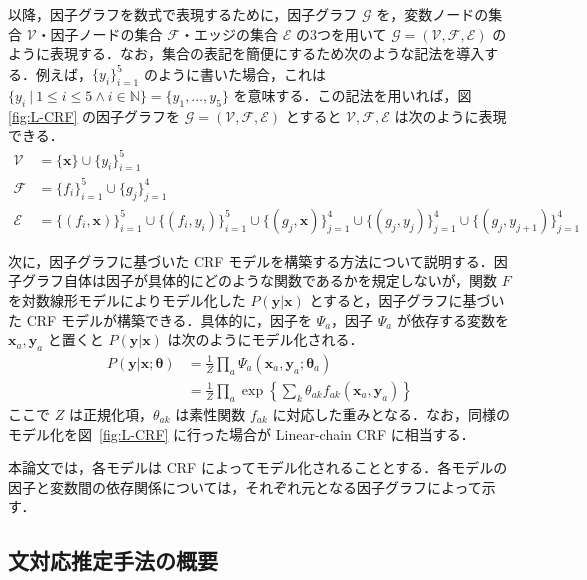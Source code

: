 \documentclass[japanese]{jnlp_1.4}
\begin{document}
以降，因子グラフを数式で表現するために，因子グラフ $\mathcal{G}$ を，変数ノードの集合 $\mathcal{V}$・因子ノードの集合 $\mathcal{F}$・エッジの集合 $\mathcal{E}$ の3つを用いて $\mathcal{G} = (\mathcal{V},\mathcal{F},\mathcal{E})$ のように表現する．なお，集合の表記を簡便にするため次のような記法を導入する．例えば，$\{ y_i \}_{i=1}^{5}$ のように書いた場合，これは $\{ y_i ~|~ 1 \leq i \leq 5 \wedge i \in \mathbb{N} \} = \{ y_1, \dots, y_5 \}$ を意味する．この記法を用いれば，図 \ref{fig:L-CRF} の因子グラフを $\mathcal{G} = (\mathcal{V},\mathcal{F},\mathcal{E})$  とすると $\mathcal{V},\mathcal{F},\mathcal{E}$ は次のように表現できる．
\begin{equation}
\begin{split}
  \mathcal{V} &= \{ \bm{x} \} \cup \{ y_i \}_{i=1}^{5} \\ 
  \mathcal{F} &= \{ f_i \}_{i=1}^{5} \cup \{ g_j \}_{j=1}^{4} \\ 
  \mathcal{E} &= \{ (f_i, \bm{x}) \}_{i=1}^{5} \cup \{ (f_i, y_i) \}_{i=1}^{5} \cup \{ (g_j, \bm{x}) \}_{j=1}^{4} \cup \{ (g_j, y_j) \}_{j=1}^{4} \cup \{ (g_j, y_{j+1}) \}_{j=1}^{4}
\end{split}
\end{equation}

次に，因子グラフに基づいた CRF モデルを構築する方法について説明する．因子グラフ自体は因子が具体的にどのような関数であるかを規定しないが，関数 $F$ を対数線形モデルによりモデル化した $P(\bm{y}|\bm{x})$ とすると，因子グラフに基づいた CRF モデルが構築できる．具体的に，因子を $\Psi_a$，因子 $\Psi_a$ が依存する変数を $\bm{x}_a, \bm{y}_a$ と置くと $P(\bm{y}|\bm{x})$ は次のようにモデル化される．
\begin{align}
  P(\bm{y}|\bm{x}; \bm{\theta}) & = \frac{1}{Z} \prod_a \Psi_a (\bm{x}_a, \bm{y}_a; \bm{\theta}_a) \\
                   & = \frac{1}{Z} \prod_a \exp \left\{ \sum_k \theta_{ak} f_{ak} (\bm{x}_a, \bm{y}_a) \right\}
\end{align}
ここで $Z$ は正規化項，$\theta_{ak}$ は素性関数 $f_{ak}$ に対応した重みとなる．なお，同様のモデル化を図~\ref{fig:L-CRF} に行った場合が Linear-chain CRF に相当する．

本論文では，各モデルは CRF によってモデル化されることとする．各モデルの因子と変数間の依存関係については，それぞれ元となる因子グラフによって示す．


\subsection{文対応推定手法の概要}
\end{document}
